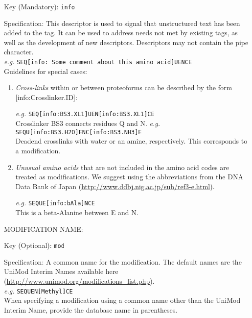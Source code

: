 Key (Mandatory): \texttt{info}

Specification: This descriptor is used to signal that unstructured text has been added to the tag. It can be used to address needs not met by existing tags, as well as the development of new descriptors. Descriptors may not contain the pipe character.
\\

\indent \textit{e.g.} \texttt{SEQ[info: Some comment about this amino acid]UENCE}
\\

Guidelines for special cases:
\begin{enumerate}
\item \textit{Cross-links} within or between proteoforms can be described by the form [info:Crosslinker.ID]:

\indent \textit{e.g.} \texttt{SEQ[info:BS3.XL1]UEN[info:BS3.XL1]CE} \\
\indent \indent Crosslinker BS3 connects residues Q and N.
\indent \textit{e.g.} \texttt{SEQU[info:BS3.H2O]ENC[info:BS3.NH3]E} \\
\indent \indent Deadend crosslinks with water or an amine, respectively. This corresponds to a modification.
\\

\item \textit{Unusual amino acids} that are not included in the amino acid codes are treated as modifications. We suggest using the abbreviations from the DNA Data Bank of Japan (\url{http://www.ddbj.nig.ac.jp/sub/ref3-e.html}).

\indent \textit{e.g.} \texttt{SEQUE[info:bAla]NCE} \\
\indent \indent This is a beta-Alanine between E and N.
\\
\end{enumerate}

\noindent \large{MODIFICATION NAME:}

Key (Optional): \texttt{mod}

Specification: A common name for the modification. The default names are the UniMod Interim Names available here (\url{http://www.unimod.org/modifications_list.php}). 
\\

\indent \textit{e.g.} \texttt{SEQUEN[Methyl]CE} 
\\

\noindent When specifying a modification using a common name other than the UniMod Interim Name, provide the database name in parentheses.

